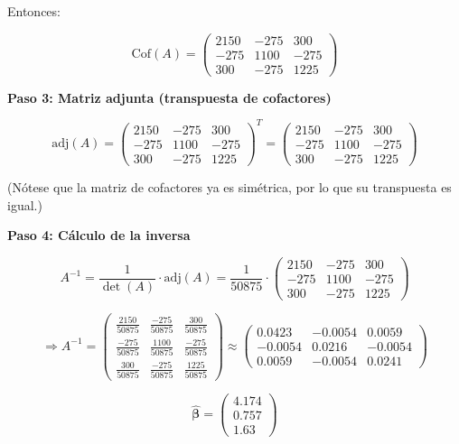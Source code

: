 \documentclass[10pt,a4paper]{article}
\begin{document}
{\begin{enumerate}
Entonces:

\[
\text{Cof}(A) = 
\begin{pmatrix}
2150 & -275 & 300 \\
-275 & 1100 & -275 \\
300 & -275 & 1225
\end{pmatrix}
\]

{\bf Paso 3: Matriz adjunta (transpuesta de cofactores)}

\[
\text{adj}(A) = 
\begin{pmatrix}
2150 & -275 & 300 \\
-275 & 1100 & -275 \\
300 & -275 & 1225
\end{pmatrix}^{T}
=
\begin{pmatrix}
2150 & -275 & 300 \\
-275 & 1100 & -275 \\
300 & -275 & 1225
\end{pmatrix}
\]

(Nótese que la matriz de cofactores ya es simétrica, por lo que su transpuesta es igual.)

{\bf Paso 4: Cálculo de la inversa}

\[
A^{-1} = \frac{1}{\det(A)} \cdot \text{adj}(A)
= \frac{1}{50875} \cdot
\begin{pmatrix}
2150 & -275 & 300 \\
-275 & 1100 & -275 \\
300 & -275 & 1225
\end{pmatrix}
\]

\[
\Rightarrow A^{-1} = 
\begin{pmatrix}
\frac{2150}{50875} & \frac{-275}{50875} & \frac{300}{50875} \\
\frac{-275}{50875} & \frac{1100}{50875} & \frac{-275}{50875} \\
\frac{300}{50875} & \frac{-275}{50875} & \frac{1225}{50875}
\end{pmatrix}
\approx
\begin{pmatrix}
0.0423 & -0.0054 & 0.0059 \\
-0.0054 & 0.0216 & -0.0054 \\
0.0059 & -0.0054 & 0.0241
\end{pmatrix}
\]

  

 \[
\hat{\boldsymbol{\beta}} =
\begin{pmatrix}
4.174 \\
0.757 \\
1.63
\end{pmatrix}
\]




\end{enumerate}}
\end{document}

